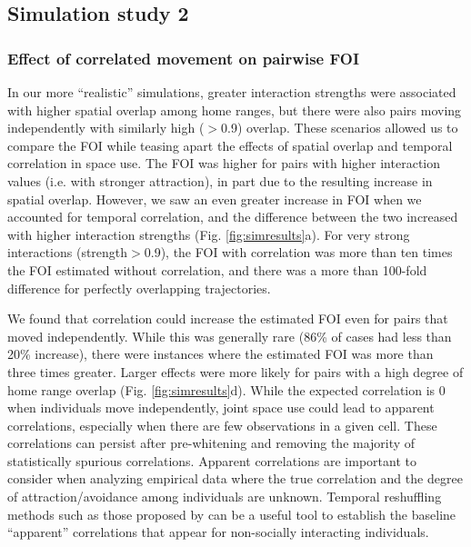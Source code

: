 \documentclass[letterpaper]{article}
\begin{document}

\subsection*{Simulation study 2}

\subsubsection*{Effect of correlated movement on pairwise FOI}

In our more ``realistic'' simulations, greater interaction strengths were associated with higher spatial overlap among home ranges, but there were also pairs moving independently with similarly high  ($>$0.9) overlap. 
These scenarios allowed us to compare the FOI while teasing apart the effects of spatial overlap and temporal correlation in space use. 
The FOI was higher for pairs with higher interaction values (i.e. with stronger attraction), in part due to the resulting increase in spatial overlap. 
However, we saw an even greater increase in FOI when we accounted for temporal correlation, and the difference between the two increased with higher interaction strengths (Fig. \ref{fig:simresults}a). For very strong interactions (strength$>$0.9), the FOI with correlation was more than ten times the FOI estimated without correlation, and there was a more than 100-fold difference for perfectly overlapping trajectories.  


We found that correlation could increase the estimated FOI even for pairs that moved independently. While this was generally rare (86\% of cases had less than 20\% increase),
there were  instances where the estimated FOI was more than three times greater. Larger effects were more likely for pairs with a high degree of home range overlap (Fig. \ref{fig:simresults}d). 
While the expected correlation is 0 when individuals move independently, joint space use could lead to apparent correlations, especially when there are few observations in a given cell. These correlations can persist after pre-whitening and removing the majority of statistically spurious correlations. Apparent correlations are important to consider when analyzing empirical data where the true correlation and the degree of attraction/avoidance among individuals are unknown. Temporal reshuffling methods such as those proposed by \citet{Spiegel2016} can be a useful tool to establish the baseline ``apparent'' correlations that appear for non-socially interacting individuals.
\end{document}
